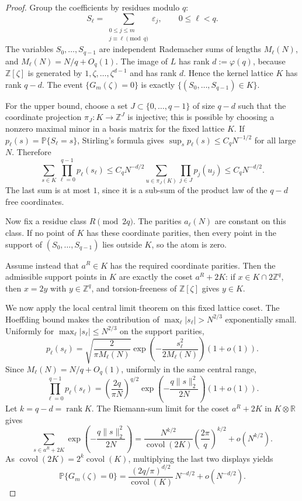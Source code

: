 \documentclass[11pt]{amsart}
\numberwithin{equation}{section}
\theoremstyle{definition}
\theoremstyle{remark}
\newcommand{\Prob}{\mathbb P}
\newcommand{\abs}[1]{\left\lvert #1\right\rvert}
\begin{document}
\begin{proof}
Group the coefficients by residues modulo \(q\):
\[
  S_\ell=\sum_{\substack{0\le j\le m\\j\equiv \ell\pmod q}}\varepsilon_j,
  \qquad 0\le \ell<q.
\]
The variables \(S_0,\ldots,S_{q-1}\) are independent Rademacher sums of lengths
\(M_\ell(N)\), and \(M_\ell(N)=N/q+O_q(1)\).
The image of \(L\) has rank \(d:=\varphi(q)\), because
\(\mathbb Z[\zeta]\) is generated by \(1,\zeta,\ldots,\zeta^{d-1}\) and has
rank \(d\).  Hence the kernel lattice \(K\) has rank \(q-d\).  The event
\(\{G_m(\zeta)=0\}\) is exactly
\(\{(S_0,\ldots,S_{q-1})\in K\}\).

For the upper bound, choose a set \(J\subset\{0,\ldots,q-1\}\) of size \(q-d\)
such that the coordinate projection \(\pi_J:K\to\mathbb Z^J\) is injective;
this is possible by choosing a nonzero maximal minor in a basis matrix for the
fixed lattice \(K\).  If
\(p_\ell(s)=\Prob\{S_\ell=s\}\), Stirling's formula gives
\(\sup_s p_\ell(s)\le C_qN^{-1/2}\) for all large \(N\).  Therefore
\[
  \sum_{s\in K}\prod_{\ell=0}^{q-1}p_\ell(s_\ell)
  \le C_q N^{-d/2}\sum_{u\in\pi_J(K)}\prod_{j\in J}p_j(u_j)
  \le C_q N^{-d/2}.
\]
The last sum is at most \(1\), since it is a sub-sum of the product law of the
\(q-d\) free coordinates.

Now fix a residue class \(R\pmod {2q}\).  The parities
\(a_\ell(N)\) are constant on this class.  If no point of \(K\) has these
coordinate parities, then every point in the support of
\((S_0,\ldots,S_{q-1})\) lies outside \(K\), so the atom is zero.

Assume instead that \(a^R\in K\) has the required coordinate parities.  Then the
admissible support points in \(K\) are exactly the coset \(a^R+2K\): if
\(x\in K\cap 2\mathbb Z^q\), then \(x=2y\) with \(y\in\mathbb Z^q\), and
torsion-freeness of \(\mathbb Z[\zeta]\) gives \(y\in K\).

We now apply the local central limit theorem on this fixed lattice coset.  The
Hoeffding bound makes the contribution of
\(\max_\ell\abs{s_\ell}>N^{2/3}\) exponentially small.  Uniformly for
\(\max_\ell\abs{s_\ell}\le N^{2/3}\) on the support parities,
\[
  p_\ell(s_\ell)
  =\sqrt{\frac{2}{\pi M_\ell(N)}}
   \exp\!\left(-\frac{s_\ell^2}{2M_\ell(N)}\right)(1+o(1)).
\]
Since \(M_\ell(N)=N/q+O_q(1)\), uniformly in the same central range,
\[
  \prod_{\ell=0}^{q-1}p_\ell(s_\ell)
  =\left(\frac{2q}{\pi N}\right)^{q/2}
   \exp\!\left(-\frac{q\|s\|_2^2}{2N}\right)(1+o(1)).
\]
Let \(k=q-d=\operatorname{rank}K\).  The Riemann-sum limit for the coset
\(a^R+2K\) in \(K\otimes\mathbb R\) gives
\[
  \sum_{s\in a^R+2K}
   \exp\!\left(-\frac{q\|s\|_2^2}{2N}\right)
  =\frac{N^{k/2}}{\operatorname{covol}(2K)}
   \left(\frac{2\pi}{q}\right)^{k/2}+o(N^{k/2}).
\]
As \(\operatorname{covol}(2K)=2^k\operatorname{covol}(K)\), multiplying the
last two displays yields
\[
  \Prob\{G_m(\zeta)=0\}
  =\frac{(2q/\pi)^{d/2}}{\operatorname{covol}(K)}\,N^{-d/2}
   +o(N^{-d/2}).
\]


\end{proof}
\end{document}
